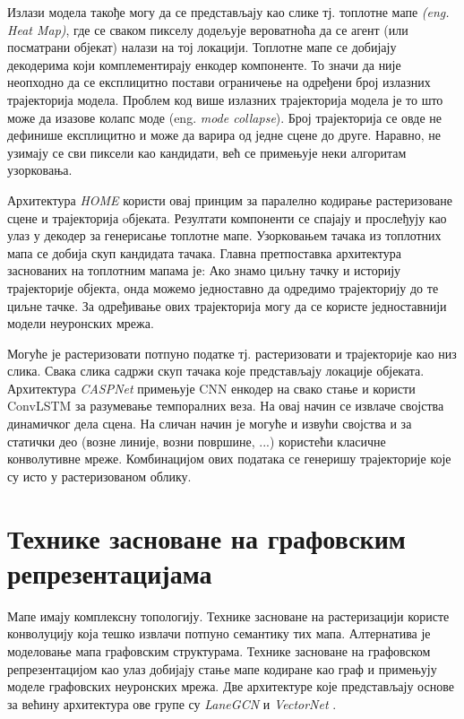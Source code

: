 \documentclass[11pt,oneside]{memoir}
\begin{document}
Излази модела такође могу да се представљају као слике тј. топлотне мапе \textit{(eng. Heat Map)}, где се сваком пикселу додељује вероватноћа
да се агент (или посматрани објекат) налази на тој локацији. Топлотне мапе се добијају декодерима који комплементирају енкодер компоненте.
То значи да није неопходно да се експлицитно постави ограничење на одређени број излазних трајекторија модела. Проблем
код више излазних трајекторија модела је то што може да изазове колапс моде (eng. \textit{mode collapse}). Број трајекторија се овде не 
дефинише експлицитно и може да варира од једне сцене до друге. Наравно, не узимају се сви пиксели као кандидати, већ се примењује неки
алгоритам узорковања. \cite{home} \cite{centernet}

Архитектура \textit{HOME} \cite{home} користи овај принцим за паралелно кодирање растеризоване сцене и трајекторија oбјеката. Резултати
компоненти се спајају и прослеђују као улаз у декодер за генерисање топлотне мапе. Узорковањем тачака из топлотних мапа се добија скуп кандидата тачака.
Главна претпоставка архитектура заснованих на топлотним мапама је: Ако знамо циљну тачку и историју трајекторије објекта, онда можемо
једноставно да одредимо трајекторију до те циљне тачке. За одређивање ових трајекторија могу да се користе једноставнији модели неуронских мрежа.

Могуће је растеризовати потпуно податке тј. растеризовати и трајекторије као низ слика. Свака слика садржи скуп тачака које представљају
локације објеката. Архитектура \textit{CASPNet} \cite{caspnet} примењује CNN енкодер на свако стање и користи ConvLSTM \cite{convlstm} за разумевање
темпоралних веза. На овај начин се извлаче својства динамичког дела сцена. На сличан начин је могуће и извући својства и за 
статички део (возне линије, возни површине, ...) користећи класичне конволутивне мреже. Комбинацијом ових података се генеришу
трајекторије које су исто у растеризованом облику.

\section{Технике засноване на графовским репрезентацијама}

Мапе имају комплексну топологију. Технике засноване на растеризацији користе конволуцију која тешко 
извлачи потпуно семантику тих мапа. Алтернатива је моделовање мапа графовским структурама. 
Технике засноване на графовском репрезентацијом као улаз добијају стање мапе кодиране као граф и примењују моделе графовских неуронских мрежа. 
Две архитектуре које представљају основе за већину архитектура ове групе су \textit{LaneGCN} \cite{lanegcn} и \textit{VectorNet} \cite{vectornet}.
\end{document}
